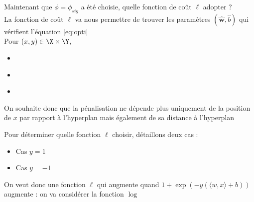 \documentclass[10pt]{beamer}
\newcommand{\hsp}{\hspace*{1em}}
\begin{document}
\begin{frame}{}
	Maintenant que $\phi = \phi_{sig}$ a été choisie, quelle fonction de coût $\ell$ adopter ?\\[2em]
	
	 \hsp La fonction de coût $\ell$ va nous permettre de trouver les paramètres $(\widehat{\mathbf{w}},\widehat{b})$ qui vérifient l'équation \eqref{eq:opti}\\[1em]
	
	Pour $(x,y) \in \X \times \Y$,  \\
	\begin{itemize}
		\item \phantom{a}\\[3em]
		\item  \phantom{a}\\[3em]
			\item  \phantom{a}\\[4em]
	\end{itemize}
	
On souhaite donc que la pénalisation ne dépende plus uniquement de la position de $x$ par rapport à l'hyperplan mais également de sa distance à l'hyperplan\\[1em]
	
\end{frame}


\begin{frame}
	Pour déterminer quelle fonction $\ell$ choisir, détaillons deux cas :\\[1em]
	
	\begin{itemize}
		\item Cas $y=1$\\[10em]
		
			\item Cas $y=-1$\\[10em]
	\end{itemize}
	On veut donc une fonction $\ell$ qui augmente quand $\displaystyle 1+ \exp\left(-y\left(\langle w,x\rangle +b\right)\right)$ augmente : on va considérer la fonction $\log$
\end{frame}
\end{document}
